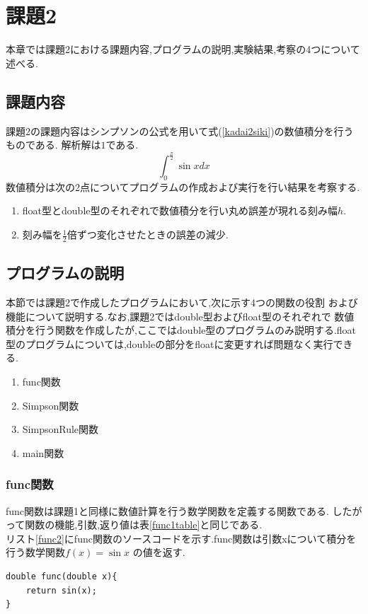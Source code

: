 \documentclass[dvipdfmx]{jarticle}
\begin{document}
    \section{課題2}
    本章では課題2における課題内容,プログラムの説明,実験結果,考察の4つについて述べる.
    \subsection{課題内容}
    課題2の課題内容はシンプソンの公式を用いて式(\ref{kadai2siki})の数値積分を行うものである.
    解析解は$1$である.
    \begin{equation}
      \int_0^\frac{\pi}{2} \sin x dx
          \label{kadai2siki}
        \end{equation}
    数値積分は次の2点についてプログラムの作成および実行を行い結果を考察する.
    \begin{enumerate}
      \item float型とdouble型のそれぞれで数値積分を行い丸め誤差が現れる刻み幅$h$.
      \item 刻み幅を$\frac{1}{2}$倍ずつ変化させたときの誤差の減少.
      \end{enumerate}

    \subsection{プログラムの説明}
    本節では課題2で作成したプログラムにおいて,次に示す4つの関数の役割
    および機能について説明する.なお,課題2ではdouble型およびfloat型のそれぞれで
    数値積分を行う関数を作成したが,ここではdouble型のプログラムのみ説明する.float
    型のプログラムについては,doubleの部分をfloatに変更すれば問題なく実行できる.
    \begin{enumerate}
      \item func関数
      \item Simpson関数
      \item SimpsonRule関数
      \item main関数
      \end{enumerate}
    
    \subsubsection{func関数}
    func関数は課題1と同様に数値計算を行う数学関数を定義する関数である.
    したがって関数の機能,引数,返り値は表\ref{func1table}と同じである.\\
      リスト\ref{func2}にfunc関数のソースコードを示す.func関数は引数xについて積分を行う数学関数$f(x)=\sin x$
      の値を返す.
      \begin{lstlisting}[basicstyle=\ttfamily\footnotesize, frame=single,label=func2,caption=func関数]
double func(double x){
    return sin(x);
} 
            \end{lstlisting}
\end{document}
